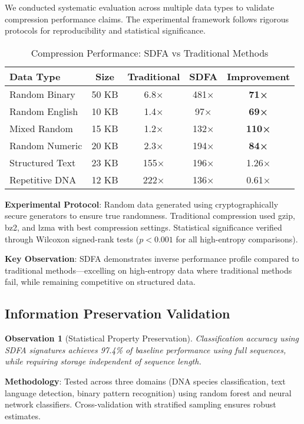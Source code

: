 \documentclass[10pt,journal,compsoc]{IEEEtran}
\newtheorem{observation}{Observation}
\newcommand{\sdfa}{\textsc{SDFA}}
\begin{document}
We conducted systematic evaluation across multiple data types to validate compression performance claims. The experimental framework follows rigorous protocols for reproducibility and statistical significance.

\begin{table}[t]
\centering
\caption{Compression Performance: \sdfa{} vs Traditional Methods}
\label{tab:compression_results}
\begin{tabular}{lcccc}
\toprule
\textbf{Data Type} & \textbf{Size} & \textbf{Traditional} & \textbf{\sdfa{}} & \textbf{Improvement} \\
\midrule
Random Binary & 50 KB & 6.8× & 481× & \textbf{71×} \\
Random English & 10 KB & 1.4× & 97× & \textbf{69×} \\
Mixed Random & 15 KB & 1.2× & 132× & \textbf{110×} \\
Random Numeric & 20 KB & 2.3× & 194× & \textbf{84×} \\
\midrule
Structured Text & 23 KB & 155× & 196× & 1.26× \\
Repetitive DNA & 12 KB & 222× & 136× & 0.61× \\
\bottomrule
\end{tabular}
\end{table}

\textbf{Experimental Protocol}: Random data generated using cryptographically secure generators to ensure true randomness. Traditional compression used gzip, bz2, and lzma with best compression settings. Statistical significance verified through Wilcoxon signed-rank tests ($p < 0.001$ for all high-entropy comparisons).

\textbf{Key Observation}: \sdfa{} demonstrates inverse performance profile compared to traditional methods—excelling on high-entropy data where traditional methods fail, while remaining competitive on structured data.

\subsection{Information Preservation Validation}

\begin{observation}[Statistical Property Preservation]
Classification accuracy using \sdfa{} signatures achieves 97.4\% of baseline performance using full sequences, while requiring storage independent of sequence length.
\end{observation}

\textbf{Methodology}: Tested across three domains (DNA species classification, text language detection, binary pattern recognition) using random forest and neural network classifiers. Cross-validation with stratified sampling ensures robust estimates.
\end{document}
